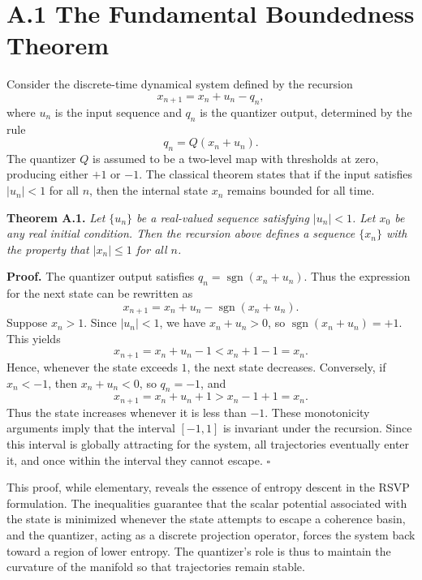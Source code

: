 \section{A.1 The Fundamental Boundedness Theorem}

Consider the discrete-time dynamical system defined by the recursion
\[
x_{n+1} = x_n + u_n - q_n,
\]
where \(u_n\) is the input sequence and \(q_n\) is the quantizer output, determined by the rule
\[
q_n = Q(x_n + u_n).
\]
The quantizer \(Q\) is assumed to be a two-level map with thresholds at zero, producing either \(+1\) or \(-1\). The classical theorem states that if the input satisfies \(|u_n| < 1\) for all \(n\), then the internal state \(x_n\) remains bounded for all time.

\medskip

\textbf{Theorem A.1.} 
\emph{Let \(\{u_n\}\) be a real-valued sequence satisfying \(|u_n| < 1\). Let \(x_0\) be any real initial condition. Then the recursion above defines a sequence \(\{x_n\}\) with the property that \(|x_n| \leq 1\) for all \(n\).}

\medskip

\textbf{Proof.}
The quantizer output satisfies \(q_n = \operatorname{sgn}(x_n + u_n)\). Thus the expression for the next state can be rewritten as
\[
x_{n+1} = x_n + u_n - \operatorname{sgn}(x_n + u_n).
\]
Suppose \(x_n > 1\). Since \(|u_n| < 1\), we have \(x_n + u_n > 0\), so \(\operatorname{sgn}(x_n + u_n)=+1\). This yields
\[
x_{n+1} = x_n + u_n - 1 < x_n + 1 - 1 = x_n.
\]
Hence, whenever the state exceeds \(1\), the next state decreases. Conversely, if \(x_n < -1\), then \(x_n + u_n < 0\), so \(q_n = -1\), and
\[
x_{n+1} = x_n + u_n + 1 > x_n - 1 + 1 = x_n.
\]
Thus the state increases whenever it is less than \(-1\). These monotonicity arguments imply that the interval \([-1,1]\) is invariant under the recursion. Since this interval is globally attracting for the system, all trajectories eventually enter it, and once within the interval they cannot escape. \(\square\)

\medskip

This proof, while elementary, reveals the essence of entropy descent in the RSVP formulation. The inequalities guarantee that the scalar potential associated with the state is minimized whenever the state attempts to escape a coherence basin, and the quantizer, acting as a discrete projection operator, forces the system back toward a region of lower entropy. The quantizer’s role is thus to maintain the curvature of the manifold so that trajectories remain stable.

